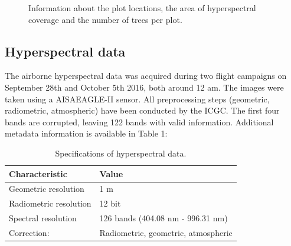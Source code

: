 \documentclass[review]{elsarticle}
\begin{document}
\begin{figure} [t!]
	\begin{center}
		\caption{Information about the plot locations, the area of hyperspectral coverage and the number of trees per plot.}
		\label{fig:study_area}
	\end{center}
\end{figure}

\subsection{Hyperspectral data}

\noindent The airborne hyperspectral data was acquired during two flight campaigns on September 28th and October 5th 2016, both around 12 am.
The images were taken using a AISAEAGLE-II sensor.
All preprocessing steps (geometric, radiometric, atmospheric) have been conducted by the \ac{ICGC}.
The first four bands are corrupted, leaving 122 bands with valid information.
Additional metadata information is available in Table 1:

\begin{table}[b!]
\centering
\caption[t]{Specifications of hyperspectral data.}
\begingroup\footnotesize
\begin{tabular}{ll}
	\\
	Characteristic         & Value                               \\
	\hline
	Geometric resolution   & 1 m                                 \\
	Radiometric resolution & 12 bit                              \\
	Spectral resolution    & 126 bands (404.08 nm - 996.31 nm)   \\
	Correction:            & Radiometric, geometric, atmospheric
\end{tabular}
\endgroup
\label{tab:hyperparameter_limits}
\end{table}
\end{document}
